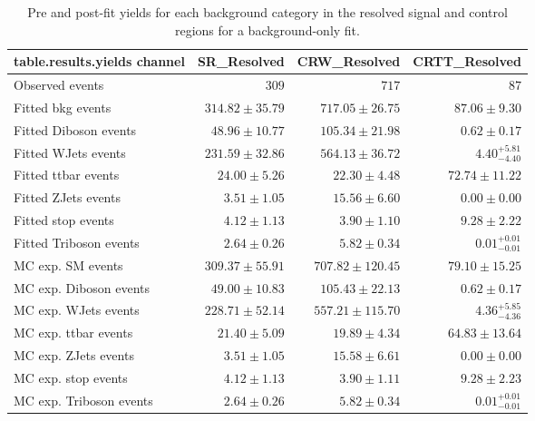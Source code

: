 \begin{table}
\centering
\small
\begin{tabular*}{\textwidth}{@{\extracolsep{\fill}}lrrr}
\toprule
\textbf{table.results.yields channel}           & SR\_Resolved            & CRW\_Resolved            & CRTT\_Resolved              \\
\midrule
Observed events          & $309$              & $717$              & $87$                    \\
\midrule
Fitted bkg events         & $314.82 \pm 35.79$          & $717.05 \pm 26.75$          & $87.06 \pm 9.30$              \\
\midrule
        Fitted Diboson events         & $48.96 \pm 10.77$          & $105.34 \pm 21.98$          & $0.62 \pm 0.17$              \\
        Fitted WJets events         & $231.59 \pm 32.86$          & $564.13 \pm 36.72$          & $4.40_{-4.40}^{+5.81}$              \\
        Fitted ttbar events         & $24.00 \pm 5.26$          & $22.30 \pm 4.48$          & $72.74 \pm 11.22$              \\
        Fitted ZJets events         & $3.51 \pm 1.05$          & $15.56 \pm 6.60$          & $0.00 \pm 0.00$              \\
        Fitted stop events         & $4.12 \pm 1.13$          & $3.90 \pm 1.10$          & $9.28 \pm 2.22$              \\
        Fitted Triboson events         & $2.64 \pm 0.26$          & $5.82 \pm 0.34$          & $0.01_{-0.01}^{+0.01}$              \\
 \midrule
MC exp. SM events              & $309.37 \pm 55.91$          & $707.82 \pm 120.45$          & $79.10 \pm 15.25$              \\
\midrule
        MC exp. Diboson events         & $49.00 \pm 10.83$          & $105.43 \pm 22.13$          & $0.62 \pm 0.17$              \\
        MC exp. WJets events         & $228.71 \pm 52.14$          & $557.21 \pm 115.70$          & $4.36_{-4.36}^{+5.85}$              \\
        MC exp. ttbar events         & $21.40 \pm 5.09$          & $19.89 \pm 4.34$          & $64.83 \pm 13.64$              \\
        MC exp. ZJets events         & $3.51 \pm 1.05$          & $15.58 \pm 6.61$          & $0.00 \pm 0.00$              \\
        MC exp. stop events         & $4.12 \pm 1.13$          & $3.90 \pm 1.11$          & $9.28 \pm 2.23$              \\
        MC exp. Triboson events         & $2.64 \pm 0.26$          & $5.82 \pm 0.34$          & $0.01_{-0.01}^{+0.01}$              \\
\bottomrule
\end{tabular*}
\caption{Pre and post-fit yields for each background category in the resolved signal and control regions for a background-only fit.}
\label{tab:yields_res}
\end{table}

